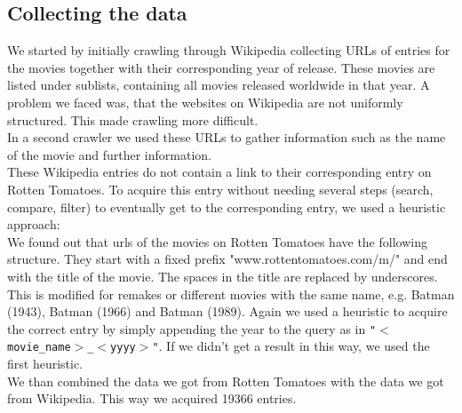 \documentclass{article}
\begin{document}
\subsection{Collecting the data}
    We started by initially crawling through Wikipedia collecting URLs of entries for the movies together with their corresponding year of release. These movies are listed under sublists, containing all movies released worldwide in that year. A problem we faced was, that the websites on Wikipedia are not uniformly structured. This made crawling more difficult.\\
    In a second crawler we used these URLs to gather information such as the name of the movie and further information. \\
    These Wikipedia entries do not contain a link to their corresponding entry on Rotten Tomatoes. To acquire this entry without needing several steps (search, compare, filter) to eventually get to the corresponding entry, we used a heuristic approach:\\
    We found out that urls of the movies on Rotten Tomatoes have the following structure. They start with a fixed prefix "www.rottentomatoes.com/m/" and end with the title of the movie. The spaces in the title are replaced by underscores.\\
    This is modified for remakes or different movies with the same name, e.g. Batman (1943), Batman (1966) and Batman (1989)\cite{batman_remakes}.
    Again we used a heuristic to acquire the correct entry by simply appending the year to the query as in \texttt{"$<$movie\_name$>$\_$<$yyyy$>$"}. If we didn't get a result in this way, we used the first heuristic.\\
    We than combined the data we got from Rotten Tomatoes with the data we got from Wikipedia. This way we acquired 19366 entries. %
\end{document}
